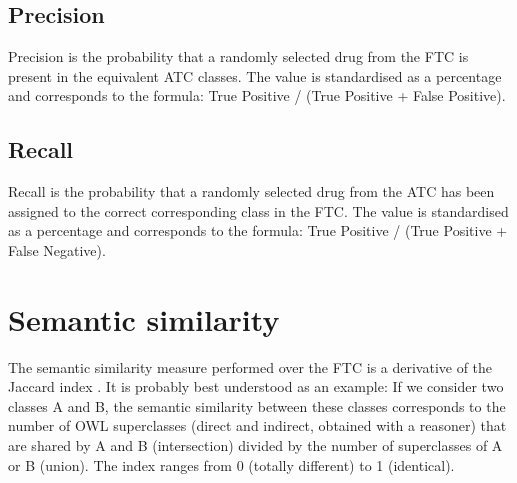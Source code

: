 \documentclass{bioinfo}
\begin{document}
\subsection{Precision}
Precision is the probability that a randomly selected drug from the FTC is present in the equivalent ATC classes. 
The value is standardised as a percentage and corresponds to the formula: True Positive / (True Positive + False Positive).

\subsection{Recall}
Recall is the probability that a randomly selected drug from the ATC has been assigned to the correct 
corresponding class in the FTC. The value is standardised as a percentage and corresponds 
to the formula: True Positive / (True Positive + False Negative).

\section{Semantic similarity}
The semantic similarity measure performed over the FTC is a derivative of the Jaccard index \citep{jaccard1912distribution} \citep{rogers1960computer}. 
It is probably best understood as an example: If we consider two classes A and B, the semantic similarity 
between these classes corresponds to the number of OWL superclasses (direct and indirect, obtained with a reasoner) that 
are shared by A and B (intersection) divided by the number of superclasses of A or B (union). The index ranges 
from 0 (totally different) to 1 (identical).
\end{document}
